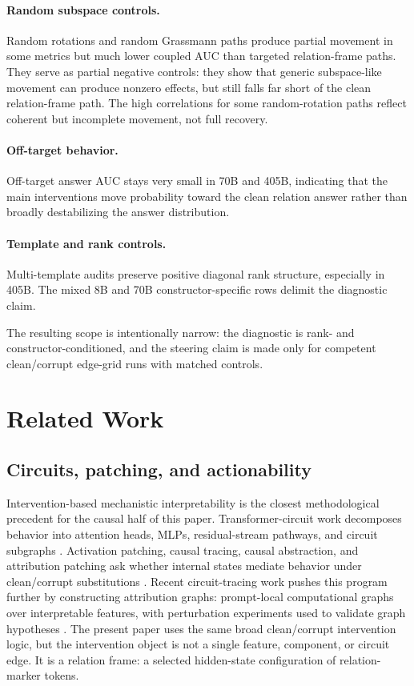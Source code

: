 \documentclass[11pt]{article}
\begin{document}
\paragraph{Random subspace controls.} Random rotations and random Grassmann paths produce partial movement in some metrics but much lower coupled AUC than targeted relation-frame paths. They serve as partial negative controls: they show that generic subspace-like movement can produce nonzero effects, but still falls far short of the clean relation-frame path. The high correlations for some random-rotation paths reflect coherent but incomplete movement, not full recovery.

\paragraph{Off-target behavior.} Off-target answer AUC stays very small in 70B and 405B, indicating that the main interventions move probability toward the clean relation answer rather than broadly destabilizing the answer distribution.

\paragraph{Template and rank controls.} Multi-template audits preserve positive diagonal rank structure, especially in 405B. The mixed 8B and 70B constructor-specific rows delimit the diagnostic claim.

The resulting scope is intentionally narrow: the diagnostic is rank- and constructor-conditioned, and the steering claim is made only for competent clean/corrupt edge-grid runs with matched controls.

\section{Related Work}

\subsection{Circuits, patching, and actionability}

Intervention-based mechanistic interpretability is the closest methodological precedent for the causal half of this paper. Transformer-circuit work decomposes behavior into attention heads, MLPs, residual-stream pathways, and circuit subgraphs \citep{elhage2021framework,wang2023interpretability,conmy2023acdc}. Activation patching, causal tracing, causal abstraction, and attribution patching ask whether internal states mediate behavior under clean/corrupt substitutions \citep{meng2022locating,geiger2021causal,syed2023attribution}. Recent circuit-tracing work pushes this program further by constructing attribution graphs: prompt-local computational graphs over interpretable features, with perturbation experiments used to validate graph hypotheses \citep{ameisen2025circuittracing,lindsey2025biology}. The present paper uses the same broad clean/corrupt intervention logic, but the intervention object is not a single feature, component, or circuit edge. It is a relation frame: a selected hidden-state configuration of relation-marker tokens.
\end{document}

